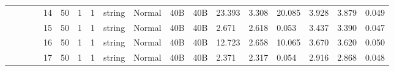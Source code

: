 \begin{landscape}
\begin{table}[]
{\begin{tabular}{@{}ccccllllllllllllll@{}}
                                                                                   &                              &                                &                                                                                                          & 14                                                    & 50                                       & 1                                          & 1                                 & string                           & Normal                             & 40B                                           & 40B                                             & 23.393                  & 3.308    & 20.085                       & 3.928                   & 3.879    & 0.049                        \\
                                                                                   &                              &                                &                                                                                                          & 15                                                    & 50                                       & 1                                          & 1                                 & string                           & Normal                             & 40B                                           & 40B                                             & 2.671                   & 2.618    & 0.053                        & 3.437                   & 3.390    & 0.047                        \\
                                                                                   &                              &                                &                                                                                                          & 16                                                    & 50                                       & 1                                          & 1                                 & string                           & Normal                             & 40B                                           & 40B                                             & 12.723                  & 2.658    & 10.065                       & 3.670                   & 3.620    & 0.050                        \\
                                                                                   &                              &                                &                                                                                                          & 17                                                    & 50                                       & 1                                          & 1                                 & string                           & Normal                             & 40B                                           & 40B                                             & 2.371                   & 2.317    & 0.054                        & 2.916                   & 2.868    & 0.048                        \\

\end{tabular}}
\end{table}
\end{landscape}
